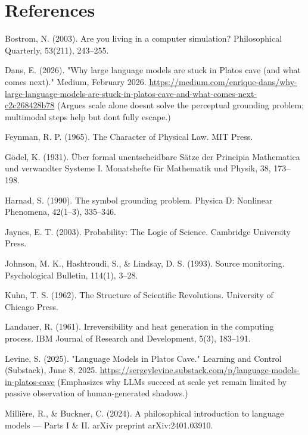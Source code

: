 \documentclass[
]{article}
\begin{document}
\section{\texorpdfstring{\textbf{References}}{References}}\label{references}

Bostrom, N. (2003). Are you living in a computer simulation?
Philosophical Quarterly, 53(211), 243--255.

Dans, E. (2026). "Why large language models are stuck in
Plato\textquotesingle s cave (and what comes next)." Medium, February
2026.
\href{https://medium.com/enrique-dans/why-large-language-models-are-stuck-in-platos-cave-and-what-comes-next-c2c268428b78}{\ul{https://medium.com/enrique-dans/why-large-language-models-are-stuck-in-platos-cave-and-what-comes-next-c2c268428b78}} 
(Argues scale alone doesn\textquotesingle t solve the perceptual
grounding problem; multimodal steps help but don\textquotesingle t fully
escape.)

Feynman, R. P. (1965). The Character of Physical Law. MIT Press.

Gödel, K. (1931). Über formal unentscheidbare Sätze der Principia
Mathematica und verwandter Systeme I. Monatshefte für Mathematik und
Physik, 38, 173--198.

Harnad, S. (1990). The symbol grounding problem. Physica D: Nonlinear
Phenomena, 42(1--3), 335--346.

Jaynes, E. T. (2003). Probability: The Logic of Science. Cambridge
University Press.

Johnson, M. K., Hashtroudi, S., \& Lindsay, D. S. (1993). Source
monitoring. Psychological Bulletin, 114(1), 3--28.

Kuhn, T. S. (1962). The Structure of Scientific Revolutions. University
of Chicago Press.

Landauer, R. (1961). Irreversibility and heat generation in the
computing process. IBM Journal of Research and Development, 5(3),
183--191.

Levine, S. (2025). "Language Models in Plato\textquotesingle s Cave."
Learning and Control (Substack), June 8, 2025.
\href{https://sergeylevine.substack.com/p/language-models-in-platos-cave}{\ul{https://sergeylevine.substack.com/p/language-models-in-platos-cave}} (Emphasizes why LLMs succeed at scale yet remain limited by passive
observation of human-generated shadows.)

Millière, R., \& Buckner, C. (2024). A philosophical introduction to
language models --- Parts I \& II. arXiv preprint arXiv:2401.03910.
\end{document}
